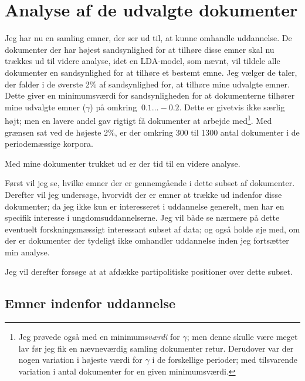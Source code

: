 \chapter{Analyse af de udvalgte dokumenter}
Jeg har nu en samling emner, der ser ud til, at kunne omhandle uddannelse.
De dokumenter der har højest sandsynlighed for at tilhøre disse emner skal nu trækkes ud til videre analyse, idet en LDA-model, som nævnt, vil tildele alle dokumenter en sandsynlighed for at tilhøre et bestemt emne.
Jeg vælger de taler, der falder i de øverste 2\% af sandsynlighed for, at tilhøre mine udvalgte emner.
Dette giver en minimumsværdi for sandsynligheden for at dokumenterne tilhører mine udvalgte emner ($\gamma$) på omkring $~0.1\ldots-0.2$.
Dette er givetvis ikke særlig højt; men en lavere andel gav rigtigt få dokumenter at arbejde med\footnote{Jeg prøvede også med en minimums\textit{værdi} for $\gamma$; men denne skulle være meget lav før jeg fik en nævneværdig samling dokumenter retur. Derudover var der nogen variation i højeste værdi for $\gamma$ i de forskellige perioder; med tilsvarende variation i antal dokumenter for en given minimumsværdi.}.
Med grænsen sat ved de højeste 2\%, er der omkring 300 til 1300 antal dokumenter i de periodemæssige korpora.

Med mine dokumenter trukket ud er der tid til en videre analyse.

Først vil jeg se, hvilke emner der er gennemgående i dette subset af dokumenter.
Derefter vil jeg undersøge, hvorvidt der er emner at trække ud indenfor disse dokumenter; da jeg ikke kun er interesseret i uddannelse generelt, men har en specifik interesse i ungdomsuddannelserne.
Jeg vil både se nærmere på dette eventuelt forskningsmæssigt interessant subset af data; og også holde øje med, om der er dokumenter der tydeligt ikke omhandler uddannelse inden jeg fortsætter min analyse.

Jeg vil derefter forsøge at at afdække partipolitiske positioner over dette subset.

\section{Emner indenfor uddannelse}

